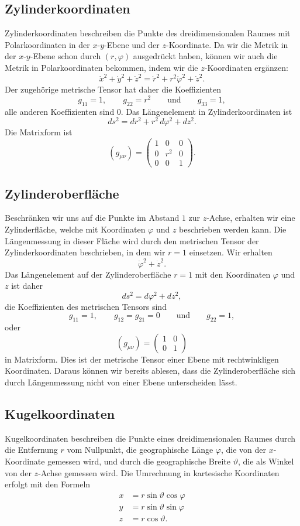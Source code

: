 \subsection{Zylinderkoordinaten}
Zylinderkoordinaten beschreiben die Punkte des dreidimensionalen
Raumes mit Polarkoordinaten in der $x$-$y$-Ebene und der $z$-Koordinate.
Da wir die Metrik in der $x$-$y$-Ebene schon durch $(r,\varphi)$
ausgedrückt haben, können wir auch die Metrik in Polarkoordinaten
bekommen, indem wir die $z$-Koordinaten ergänzen:
\[
\dot x^2+\dot y^2 +\dot z^2
=
\dot r^2 + r^2\dot\varphi^2 + \dot z^2.
\]
Der zugehörige metrische Tensor hat daher die Koeffizienten
\[
g_{11}=1,\qquad
g_{22}=r^2
\qquad\text{und}\qquad
g_{33}=1,
\]
alle anderen Koeffizienten sind $0$.
Das Längenelement in Zylinderkoordinaten ist
\[
ds^2
=
dr^2+r^2\,d\varphi^2 + dz^2.
\]
%
Die Matrixform ist
\[
(g_{\mu\nu})
=
\begin{pmatrix}
1&  0&0\\
0&r^2&0\\
0&  0&1
\end{pmatrix}.
\]

\subsection{Zylinderoberfläche}
Beschränken wir uns auf die Punkte im Abstand $1$ zur $z$-Achse, erhalten
wir eine Zylinderfläche, welche mit Koordinaten $\varphi$ und $z$
beschrieben werden kann.
Die Längenmessung in dieser Fläche wird durch den metrischen
Tensor der Zylinderkoordinaten beschrieben, in dem wir $r=1$ einsetzen.
Wir erhalten
\[
\dot\varphi^2+\dot z^2.
\]
Das Längenelement auf der Zylinderoberfläche $r=1$ mit den Koordinaten
$\varphi$ und $z$ ist daher
\[
ds^2
=
d\varphi^2+dz^2,
\]
%
die Koeffizienten des metrischen Tensors sind
\[
g_{11}=1,\qquad
g_{12}=g_{21}=0
\qquad\text{und}\qquad
g_{22}=1,
\]
oder
\[
(g_{\mu\nu})
=
\begin{pmatrix}
1&0\\0&1
\end{pmatrix}
\]
in Matrixform.
Dies ist der metrische Tensor einer Ebene mit rechtwinkligen Koordinaten.
Daraus können wir bereits ablesen, dass die Zylinderoberfläche sich durch
Längenmessung nicht von einer Ebene unterscheiden lässt.

\subsection{Kugelkoordinaten}
Kugelkoordinaten beschreiben die Punkte eines dreidimensionalen Raumes
durch die Entfernung $r$ vom Nullpunkt, die geographische Länge
$\varphi$, die von
der $x$-Koordinate gemessen wird, und durch die geographische Breite
$\vartheta$,
die als Winkel von der $z$-Achse gemessen wird.
Die Umrechnung in kartesische Koordinaten erfolgt mit den Formeln
\begin{align*}
x&= r\sin\vartheta\cos\varphi\\
y&= r\sin\vartheta\sin\varphi\\
z&= r\cos\vartheta.
\end{align*}
